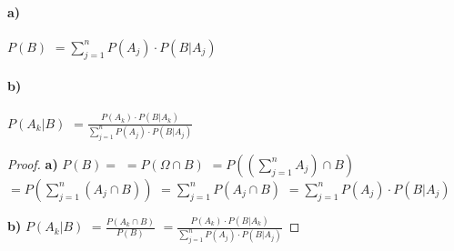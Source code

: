 \paragraph{a)}
$P(B)$
$=\sum_{j=1}^{n} P(A_j) \cdot P(B|A_j)$

\paragraph{b)}
$P(A_k|B)$
$=\frac{P(A_k) \cdot P(B|A_k)}{\sum_{j=1}^{n} P(A_j) \cdot P(B|A_j)}$

\begin{proof}
\textbf{a)}
$P(B)=$
$=P(\Omega \cap B)$
$=P((\sum_{j=1}^{n} A_j) \cap B)$
$=P(\sum_{j=1}^{n} (A_j \cap B))$
$=\sum_{j=1}^{n} P(A_j \cap B)$
$=\sum_{j=1}^{n} P(A_j) \cdot P(B|A_j)$

\textbf{b)}
$P(A_k|B)$
$=\frac{P(A_k \cap B)}{P(B)}$
$=\frac{P(A_k) \cdot P(B|A_k)}{\sum_{j=1}^{n} P(A_j) \cdot P(B|A_j)}$
\end{proof}